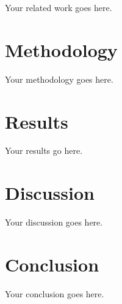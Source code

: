 \documentclass[journal]{IEEEtran}
\begin{document}
Your related work goes here.

\section{Methodology}
\label{sec:methodology}

Your methodology goes here.

\section{Results}
\label{sec:results}

Your results go here.

\section{Discussion}
\label{sec:discussion}

Your discussion goes here.

\section{Conclusion}
\label{sec:conclusion}

Your conclusion goes here.



\end{document}
